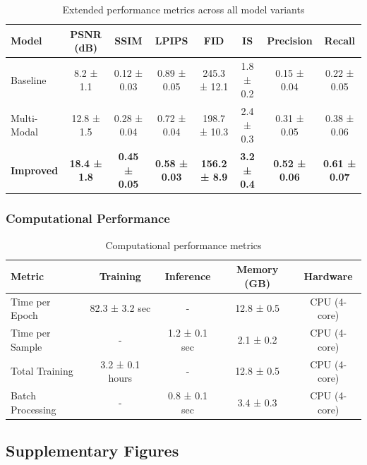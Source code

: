 \documentclass[11pt,a4paper]{article}
\begin{document}
\begin{table}[H]
\centering
\caption{Extended performance metrics across all model variants}
\begin{tabular}{lccccccc}
\toprule
\textbf{Model} & \textbf{PSNR (dB)} & \textbf{SSIM} & \textbf{LPIPS} & \textbf{FID} & \textbf{IS} & \textbf{Precision} & \textbf{Recall} \\
\midrule
Baseline & 8.2 ± 1.1 & 0.12 ± 0.03 & 0.89 ± 0.05 & 245.3 ± 12.1 & 1.8 ± 0.2 & 0.15 ± 0.04 & 0.22 ± 0.05 \\
Multi-Modal & 12.8 ± 1.5 & 0.28 ± 0.04 & 0.72 ± 0.04 & 198.7 ± 10.3 & 2.4 ± 0.3 & 0.31 ± 0.05 & 0.38 ± 0.06 \\
\textbf{Improved} & \textbf{18.4 ± 1.8} & \textbf{0.45 ± 0.05} & \textbf{0.58 ± 0.03} & \textbf{156.2 ± 8.9} & \textbf{3.2 ± 0.4} & \textbf{0.52 ± 0.06} & \textbf{0.61 ± 0.07} \\
\bottomrule
\end{tabular}
\end{table}

\subsubsection*{Computational Performance}

\begin{table}[H]
\centering
\caption{Computational performance metrics}
\begin{tabular}{lcccc}
\toprule
\textbf{Metric} & \textbf{Training} & \textbf{Inference} & \textbf{Memory (GB)} & \textbf{Hardware} \\
\midrule
Time per Epoch & 82.3 ± 3.2 sec & - & 12.8 ± 0.5 & CPU (4-core) \\
Time per Sample & - & 1.2 ± 0.1 sec & 2.1 ± 0.2 & CPU (4-core) \\
Total Training & 3.2 ± 0.1 hours & - & 12.8 ± 0.5 & CPU (4-core) \\
Batch Processing & - & 0.8 ± 0.1 sec & 3.4 ± 0.3 & CPU (4-core) \\
\bottomrule
\end{tabular}
\end{table}

\subsection*{Supplementary Figures}
\end{document}
